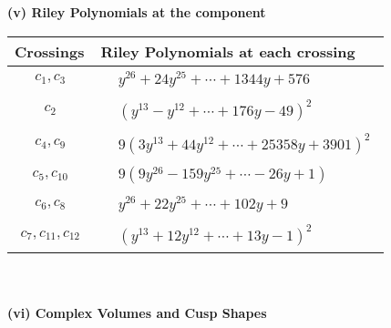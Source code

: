 \documentclass[1p]{elsarticle_modified}
\theoremstyle{definition}
\begin{document}
\newpage\renewcommand{\arraystretch}{1}
\flushleft \textbf{(v) Riley Polynomials at the component}\newline \\
\begin{tabular}{m{50pt}|m{274pt}}
Crossings & \hspace{64pt}Riley Polynomials at each crossing \\
\hline $$\begin{aligned}c_{1},c_{3}\end{aligned}$$&$\begin{aligned}
&y^{26}+24 y^{25}+\cdots+1344 y+576
\end{aligned}$\\
\hline $$\begin{aligned}c_{2}\end{aligned}$$&$\begin{aligned}
&(y^{13}- y^{12}+\cdots+176 y-49)^{2}
\end{aligned}$\\
\hline $$\begin{aligned}c_{4},c_{9}\end{aligned}$$&$\begin{aligned}
&9(3 y^{13}+44 y^{12}+\cdots+25358 y+3901)^{2}
\end{aligned}$\\
\hline $$\begin{aligned}c_{5},c_{10}\end{aligned}$$&$\begin{aligned}
&9(9 y^{26}-159 y^{25}+\cdots-26 y+1)
\end{aligned}$\\
\hline $$\begin{aligned}c_{6},c_{8}\end{aligned}$$&$\begin{aligned}
&y^{26}+22 y^{25}+\cdots+102 y+9
\end{aligned}$\\
\hline $$\begin{aligned}c_{7},c_{11},c_{12}\end{aligned}$$&$\begin{aligned}
&(y^{13}+12 y^{12}+\cdots+13 y-1)^{2}
\end{aligned}$\\
\hline
\end{tabular}\\~\\
\newpage\flushleft \textbf{(vi) Complex Volumes and Cusp Shapes}
\end{document}
